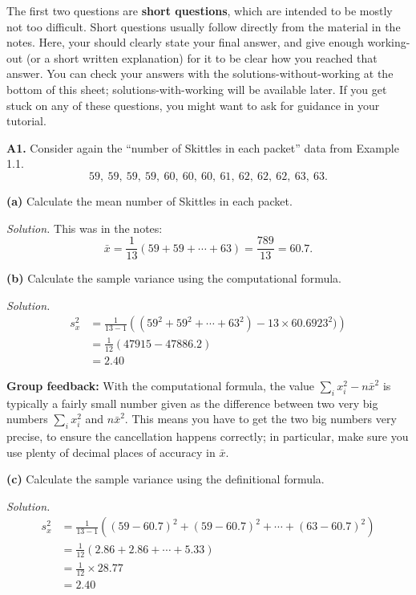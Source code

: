 \documentclass[
  a4paper,
]{book}
\theoremstyle{definition}
\theoremstyle{definition}
\theoremstyle{definition}
\theoremstyle{definition}
\theoremstyle{remark}
\begin{document}
The first two questions are \textbf{short questions}, which are intended to be mostly not too difficult. Short questions usually follow directly from the material in the notes. Here, your should clearly state your final answer, and give enough working-out (or a short written explanation) for it to be clear how you reached that answer. You can check your answers with the solutions-without-working at the bottom of this sheet; solutions-with-working will be available later. If you get stuck on any of these questions, you might want to ask for guidance in your tutorial.

\textbf{A1.} Consider again the ``number of Skittles in each packet'' data from Example 1.1.
\[ 59, \ 59, \ 59, \ 59, \ 60, \ 60, \ 60, \ 61, \ 62, \ 62, \ 62, \ 63, \ 63 .\]

\textbf{(a)} Calculate the mean number of Skittles in each packet.

\begin{myanswers}
\emph{Solution.}
This was in the notes:
\[ \bar x = \frac{1}{13} (59 + 59 + \cdots + 63) =  \frac{789}{13} = 60.7 .\]

\end{myanswers}

\textbf{(b)} Calculate the sample variance using the computational formula.

\begin{myanswers}
\emph{Solution.}
\begin{align*}
  s_x^2 &= \frac{1}{13 - 1} \left( (59^2 + 59^2 + \cdots + 63^2) - 13 \times 60.6923^2)\right) \\
        &= \frac{1}{12} (47915 - 47886.2) \\
        &= 2.40
\end{align*}

\textbf{Group feedback:} With the computational formula, the value \(\sum_i x_i^2 - n \bar{x}^2\) is typically a fairly small number given as the difference between two very big numbers \(\sum_i x_i^2\) and \(n \bar x^2\). This means you have to get the two big numbers very precise, to ensure the cancellation happens correctly; in particular, make sure you use plenty of decimal places of accuracy in \(\bar x\).

\end{myanswers}

\textbf{(c)} Calculate the sample variance using the definitional formula.

\begin{myanswers}
\emph{Solution.}
\begin{align*}
  s_x^2 &= \frac{1}{13 - 1} \left( (59 - 60.7)^2 + (59 - 60.7)^2 + \cdots + (63 - 60.7)^2 \right) \\
        &= \frac{1}{12} (2.86 + 2.86 + \cdots + 5.33) \\
        &= \frac{1}{12} \times 28.77 \\
        &= 2.40
\end{align*}

\end{myanswers}
\end{document}

